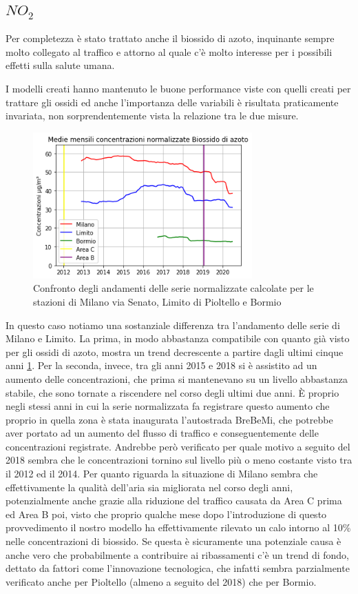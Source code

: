 \subsection{$NO_2$}
Per completezza è stato trattato anche il biossido di azoto, inquinante sempre molto collegato al traffico e attorno al quale c'è molto interesse per i possibili effetti sulla salute umana.

I modelli creati hanno mantenuto le buone performance viste con quelli creati per trattare gli ossidi ed anche l'importanza delle variabili è risultata praticamente invariata, non sorprendentemente vista la relazione tra le due misure.

\begin{figure}[h]
\centering
\includegraphics[width=0.75\textwidth]{no2_traffico}
\caption{Confronto degli andamenti delle serie normalizzate calcolate per le stazioni di Milano via Senato, Limito di Pioltello e Bormio}
\label{fig:no2_traffico}
\end{figure}

In questo caso notiamo una sostanziale differenza tra l'andamento delle serie di Milano e Limito. La prima, in modo abbastanza compatibile con quanto già visto per gli ossidi di azoto, mostra un trend decrescente a partire dagli ultimi cinque anni \ref{fig:no2_traffico}. Per la seconda, invece, tra gli anni 2015 e 2018 si è assistito ad un aumento delle concentrazioni, che prima si mantenevano su un livello abbastanza stabile, che sono tornate a riscendere nel corso degli ultimi due anni. È proprio negli stessi anni in cui la serie normalizzata fa registrare questo aumento che proprio in quella zona è stata inaugurata l'autostrada BreBeMi, che potrebbe aver portato ad un aumento del flusso di traffico e conseguentemente delle concentrazioni registrate. Andrebbe però verificato per quale motivo a seguito del 2018 sembra che le concentrazioni tornino sul livello più o meno costante visto tra il 2012 ed il 2014.
Per quanto riguarda la situazione di Milano sembra che effettivamente la qualità dell'aria sia migliorata nel corso degli anni, potenzialmente anche grazie alla riduzione del traffico causata da Area C prima ed Area B poi, visto che proprio qualche mese dopo l'introduzione di questo provvedimento il nostro modello ha effettivamente rilevato un calo intorno al 10\% nelle concentrazioni di biossido. Se questa è sicuramente una potenziale causa è anche vero che probabilmente a contribuire ai ribassamenti c'è un trend di fondo, dettato da fattori come l'innovazione tecnologica, che infatti sembra parzialmente verificato anche per Pioltello (almeno a seguito del 2018) che per Bormio.

